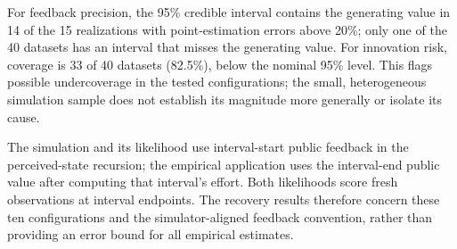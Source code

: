 For feedback precision, the 95\% credible interval contains the generating value in 14 of the 15 realizations with point-estimation errors above 20\%; only one of the 40 datasets has an interval that misses the generating value. For innovation risk, coverage is 33 of 40 datasets (82.5\%), below the nominal 95\% level. This flags possible undercoverage in the tested configurations; the small, heterogeneous simulation sample does not establish its magnitude more generally or isolate its cause.

{The simulation and its likelihood use interval-start public feedback in the perceived-state recursion; the empirical application uses the interval-end public value after computing that interval's effort. Both likelihoods score fresh observations at interval endpoints. The recovery results therefore concern these ten configurations and the simulator-aligned feedback convention, rather than providing an error bound for all empirical estimates.}

